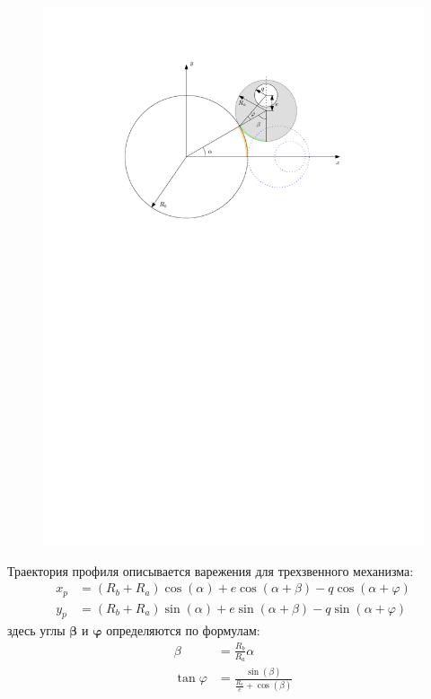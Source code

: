 \documentclass[a4paper, 12pt]{article}
\begin{document}
\begin{figure}
    \centering
    \includegraphics{images/Profile-description1.pdf}
\end{figure}

Траектория профиля описывается варежения для трехзвенного механизма:
\begin{equation}
    \begin{split}
        x_p & = (R_b + R_a)\cos{(\alpha)} + e\cos{(\alpha + \beta)} - q\cos{(\alpha + \varphi)} \\
        y_p & = (R_b + R_a)\sin{(\alpha)} + e\sin{(\alpha + \beta)} - q\sin{(\alpha + \varphi)}
    \end{split}
\end{equation}
здесь углы $\bm{\beta}$ и $\bm{\varphi}$ определяются по формулам:
\begin{align}
    \beta &= \frac{R_b}{R_a}\alpha \\
    \tan{\varphi} &= \frac{\sin{(\beta)}}{\frac{R_a}{e} + \cos{(\beta)}}
\end{align}
\end{document}
